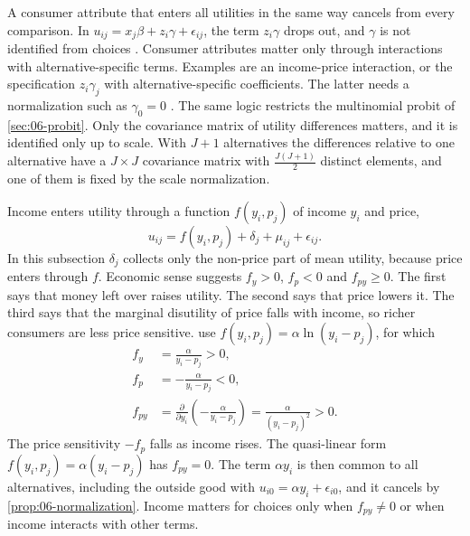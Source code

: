 \begin{remark}\label{rem:06-invariant}
A consumer attribute that enters all utilities in the same way cancels from every comparison. In
$u_{ij} = x_j\beta + z_i\gamma + \epsilon_{ij}$, the term $z_i\gamma$ drops out, and $\gamma$ is not identified
from choices \citep[p.~1412]{McFadden1984}. Consumer attributes matter only through interactions with
alternative-specific terms. Examples are an income-price interaction, or the specification
$z_i\gamma_j$ with alternative-specific coefficients. The latter needs a normalization such as $\gamma_0 = 0$
\citep[eq.~3.16, p.~1413]{McFadden1984}. The same logic restricts the multinomial probit of
\cref{sec:06-probit}. Only the covariance matrix of utility differences matters, and it is identified only up to
scale. With $J+1$ alternatives the differences relative to one alternative have a $J\times J$ covariance matrix
with $\frac{J(J+1)}{2}$ distinct elements, and one of them is fixed by the scale normalization.
\end{remark}

Income enters utility through a function $f(y_i, p_j)$ of income $y_i$ and price,
\begin{equation}\label{eq:06-income}
u_{ij} = f(y_i, p_j) + \delta_j + \mu_{ij} + \epsilon_{ij}.
\end{equation}
In this subsection $\delta_j$ collects only the non-price part of mean utility, because price enters through $f$.
Economic sense suggests $f_y > 0$, $f_p < 0$ and $f_{py} \ge 0$. The first says that money left over raises
utility. The second says that price lowers it. The third says that the marginal disutility of price falls with
income, so richer consumers are less price sensitive.  use
$f(y_i, p_j) = \alpha\ln(y_i - p_j)$, for which
\begin{align*}
f_y &= \frac{\alpha}{y_i - p_j} > 0, \\
f_p &= -\frac{\alpha}{y_i - p_j} < 0, \\
f_{py} &= \frac{\partial}{\partial y_i}\left(-\frac{\alpha}{y_i - p_j}\right) = \frac{\alpha}{(y_i - p_j)^2} > 0 .
\end{align*}
The price sensitivity $-f_p$ falls as income rises. The quasi-linear form $f(y_i, p_j) = \alpha(y_i - p_j)$
has $f_{py} = 0$. The term $\alpha y_i$ is then common to all alternatives, including the outside good with
$u_{i0} = \alpha y_i + \epsilon_{i0}$, and it cancels by \cref{prop:06-normalization}. Income matters for
choices only when $f_{py} \neq 0$ or when income interacts with other terms.

